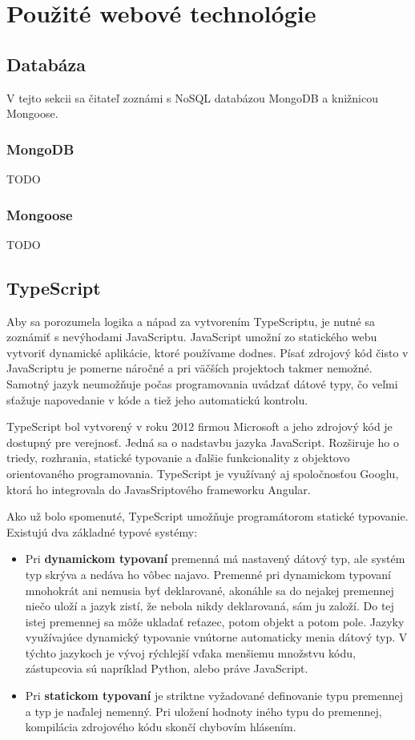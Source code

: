 \chapter{Použité webové technológie}
\section{Databáza}
V tejto sekcii sa čitateľ zoznámi s NoSQL databázou MongoDB a knižnicou Mongoose.

\subsection{MongoDB}
\label{mongodb}
TODO

\subsection{Mongoose}
TODO

\section{TypeScript}
\label{typescript}
Aby sa porozumela logika a nápad za vytvorením TypeScriptu, je nutné sa zoznámiť s nevýhodami JavaScriptu. JavaScript\cite{typescript} umožní zo statického webu vytvoriť dynamické aplikácie, ktoré používame dodnes. Písať zdrojový kód čisto v JavaScriptu je pomerne náročné a pri väčších projektoch takmer nemožné. Samotný jazyk neumožňuje počas programovania uvádzať dátové typy, čo veľmi sťažuje napovedanie v kóde a tiež jeho automatickú kontrolu.

TypeScript\cite{typescript} bol vytvorený v roku 2012 firmou Microsoft a jeho zdrojový kód je dostupný pre verejnosť. Jedná sa o nadstavbu jazyka JavaScript. Rozširuje ho o triedy, rozhrania, statické typovanie a ďalšie funkcionality z objektovo orientovaného programovania. TypeScript je využívaný aj spoločnosťou Googlu, ktorá ho integrovala do JavasSriptového frameworku Angular.

Ako už bolo spomenuté, TypeScript umožňuje programátorom statické typovanie. Existujú dva základné typové systémy:
    \begin{itemize}
        \item Pri \textbf{dynamickom typovaní} premenná má nastavený dátový typ, ale systém typ skrýva a nedáva ho vôbec najavo. Premenné pri dynamickom typovaní mnohokrát ani nemusia byť deklarované, akonáhle sa do nejakej premennej niečo uloží a jazyk zistí, že nebola nikdy deklarovaná, sám ju založí. Do tej istej premennej sa môže ukladať reťazec, potom objekt a potom pole. Jazyky využívajúce dynamický typovanie vnútorne automaticky menia dátový typ. V týchto jazykoch je vývoj rýchlejší vďaka menšiemu množstvu kódu, zástupcovia sú napríklad Python, alebo práve JavaScript.
        \item Pri \textbf{statickom typovaní} je striktne vyžadované definovanie typu premennej a typ je naďalej nemenný. Pri uložení hodnoty iného typu do premennej, kompilácia zdrojového kódu skončí chybovím hlásením.
    \end{itemize}
    
